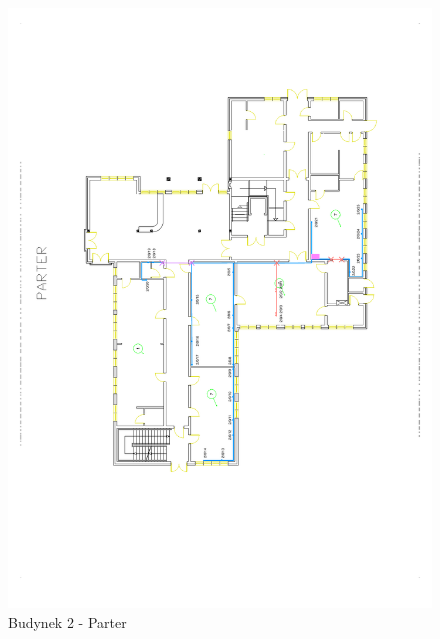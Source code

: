 \begin{figure}[H]
  \begin{center}
    \includegraphics[width=\textwidth]{img/s/b2-0.pdf}
    \caption{Budynek 2 - Parter}
  \end{center}
\end{figure}


